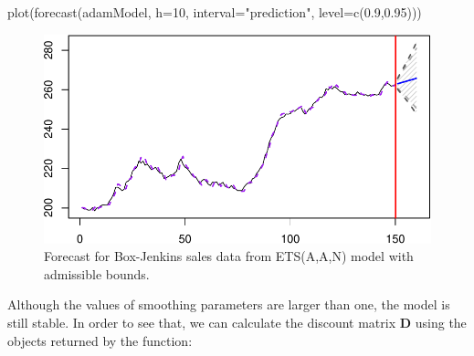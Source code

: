 \documentclass[
]{book}
\newenvironment{Shaded}{\begin{snugshade}}{\end{snugshade}}
\newcommand{\AttributeTok}[1]{\textcolor[rgb]{0.77,0.63,0.00}{#1}}
\newcommand{\ConstantTok}[1]{\textcolor[rgb]{0.00,0.00,0.00}{#1}}
\newcommand{\DecValTok}[1]{\textcolor[rgb]{0.00,0.00,0.81}{#1}}
\newcommand{\FloatTok}[1]{\textcolor[rgb]{0.00,0.00,0.81}{#1}}
\newcommand{\FunctionTok}[1]{\textcolor[rgb]{0.00,0.00,0.00}{#1}}
\newcommand{\NormalTok}[1]{#1}
\newcommand{\OtherTok}[1]{\textcolor[rgb]{0.56,0.35,0.01}{#1}}
\newcommand{\SpecialCharTok}[1]{\textcolor[rgb]{0.00,0.00,0.00}{#1}}
\newcommand{\StringTok}[1]{\textcolor[rgb]{0.31,0.60,0.02}{#1}}
\theoremstyle{definition}
\theoremstyle{definition}
\theoremstyle{definition}
\theoremstyle{definition}
\theoremstyle{remark}
\begin{document}
\begin{Shaded}
\begin{Highlighting}[]
\FunctionTok{plot}\NormalTok{(}\FunctionTok{forecast}\NormalTok{(adamModel, }\AttributeTok{h=}\DecValTok{10}\NormalTok{,}
              \AttributeTok{interval=}\StringTok{"prediction"}\NormalTok{, }\AttributeTok{level=}\FunctionTok{c}\NormalTok{(}\FloatTok{0.9}\NormalTok{,}\FloatTok{0.95}\NormalTok{)))}
\end{Highlighting}
\end{Shaded}

\begin{figure}
\centering
\includegraphics{Svetunkov--2022----ADAM_files/figure-latex/BJsalesAANForecastAdmissible-1.pdf}
\caption{\label{fig:BJsalesAANForecastAdmissible}Forecast for Box-Jenkins sales data from ETS(A,A,N) model with admissible bounds.}
\end{figure}

Although the values of smoothing parameters are larger than one, the model is still stable. In order to see that, we can calculate the discount matrix \(\mathbf{D}\) using the objects returned by the function:

\begin{Shaded}
\end{Shaded}
\end{document}

